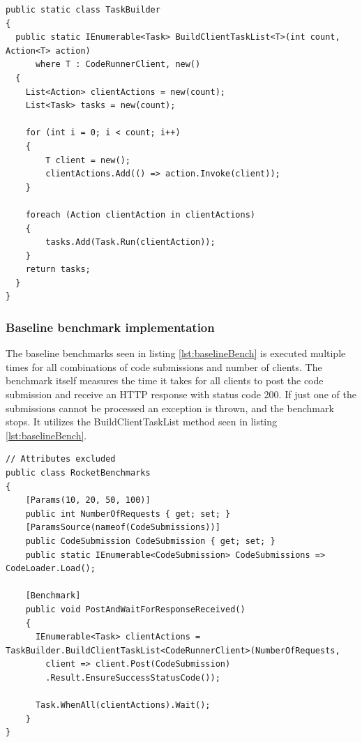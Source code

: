 \begin{lstlisting}[language=CSharp, escapechar=~, caption={C\# code showing the BuildClientTaskList method, which is used to build a number of actions which are executed simultaneously in a Task}, label={lst:TaskBuilder}]
public static class TaskBuilder
{
  public static IEnumerable<Task> BuildClientTaskList<T>(int count, Action<T> action)
      where T : CodeRunnerClient, new()
  {
    List<Action> clientActions = new(count);
    List<Task> tasks = new(count);
    
    for (int i = 0; i < count; i++)
    {
        T client = new();
        clientActions.Add(() => action.Invoke(client));
    }

    foreach (Action clientAction in clientActions)
    {
        tasks.Add(Task.Run(clientAction));
    }
    return tasks;
  }
}
\end{lstlisting}

\subsubsection{Baseline benchmark implementation}
The baseline benchmarks seen in listing \ref{lst:baselineBench} is executed multiple times for all combinations of code submissions and number of clients.
The benchmark itself measures the time it takes for all clients to post the code submission and receive an HTTP response with status code 200.
If just one of the submissions cannot be processed an exception is thrown, and the benchmark stops.
It utilizes the BuildClientTaskList method seen in listing \ref{lst:baselineBench}.
\begin{lstlisting}[language=CSharp, escapechar=~, caption={C\# code showing the implementation of the benchmark for the baseline}, label={lst:baselineBench}]
// Attributes excluded
public class RocketBenchmarks
{
    [Params(10, 20, 50, 100)] 
    public int NumberOfRequests { get; set; }
    [ParamsSource(nameof(CodeSubmissions))]
    public CodeSubmission CodeSubmission { get; set; }
    public static IEnumerable<CodeSubmission> CodeSubmissions => CodeLoader.Load();

    [Benchmark]
    public void PostAndWaitForResponseReceived()
    {
      IEnumerable<Task> clientActions = TaskBuilder.BuildClientTaskList<CodeRunnerClient>(NumberOfRequests,
        client => client.Post(CodeSubmission)
        .Result.EnsureSuccessStatusCode());
        
      Task.WhenAll(clientActions).Wait();
    }
}
\end{lstlisting}

